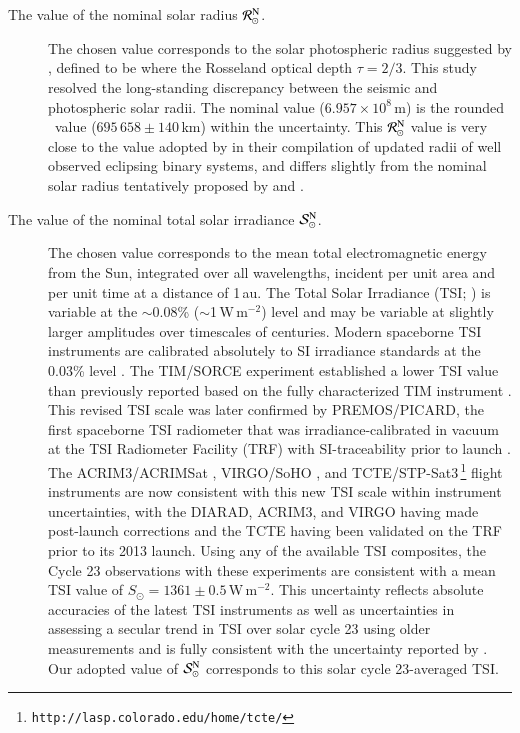 \documentclass[preprint]{aastex}
\newcommand{\Rnom}{\hbox{$\mathcal{R}^{\mathrm N}_\odot$}}
\newcommand{\Snom}{\hbox{$\mathcal{S}^{\mathrm N}_\odot$}}
\newcommand{\rev}[1]{{#1}}
\begin{document}
\begin{description}
\item[The value of the nominal solar radius $\Rnom$.] The chosen value corresponds to the solar photospheric radius suggested by \citet{haberreiter2008}, defined to be where the Rosseland optical depth $\tau = 2/3$. This study resolved the long-standing discrepancy between the seismic and photospheric solar radii. The nominal value ($6.957 \times 10^8$\,m) is the rounded \citeauthor{haberreiter2008}~value ($695\,658 \pm 140$\,km) within the uncertainty. This $\Rnom$ value is very close to the value adopted by \citet{torres2010} in their compilation of updated radii of well observed eclipsing binary systems, and differs slightly from the nominal solar radius tentatively proposed by \citet{harmanec2011} and \citet{prsa2012}.

\item[The value of the nominal total solar irradiance $\Snom$.] The chosen value corresponds to the mean total electromagnetic energy from the Sun, integrated over all wavelengths, incident per unit area and per unit time at a distance of 1\,au. The Total Solar Irradiance (TSI; \citealt{willson1978}) is variable at the $\sim$0.08\% ($\sim$1\,W\,m${}^{-2}$) level and may be variable at slightly larger amplitudes over timescales of centuries. Modern spaceborne TSI instruments are calibrated absolutely to SI irradiance standards at the 0.03\% level \citep{kopp2014}. The TIM/SORCE experiment established a lower TSI value than previously reported based on the fully characterized TIM instrument \citep{kopp2005, kopp2011}. This revised TSI scale was later confirmed by PREMOS/PICARD, the first spaceborne TSI radiometer that was irradiance-calibrated in vacuum at the TSI Radiometer Facility (TRF) with SI-traceability prior to launch \citep{schmutz2013}. The ACRIM3/ACRIMSat \citep{willson2014}, VIRGO/SoHO \citep{frohlich1997}, and TCTE/STP-Sat3\,\footnote{{\tt http://lasp.colorado.edu/home/tcte/}} flight instruments are now consistent with this new TSI scale within instrument uncertainties, with the DIARAD, ACRIM3, and VIRGO having made post-launch corrections and the TCTE having been validated on the TRF prior to its 2013 launch. \rev{Using any of the available TSI composites,} the Cycle 23 observations with these experiments are consistent with a mean TSI value of \rev{$S_\odot = 1361 \pm 0.5$\,W\,m${}^{-2}$. This uncertainty reflects absolute accuracies of the latest TSI instruments as well as uncertainties in assessing a secular trend in TSI over solar cycle 23 using older measurements and is fully consistent with the uncertainty reported by \citet{kopp2011}}. Our adopted value of $\Snom$ corresponds to this solar cycle 23-averaged TSI.


\end{description}
\end{document}
